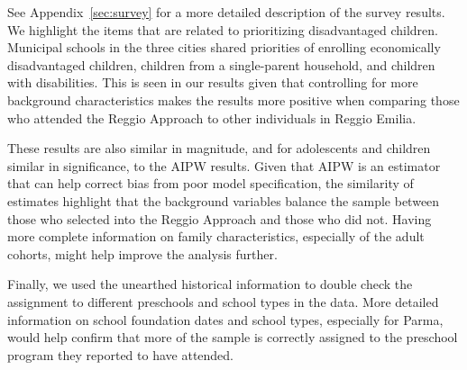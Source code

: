 See Appendix~\ref{sec:survey} for a more detailed description of the survey results. We highlight the items that are related to prioritizing disadvantaged children. Municipal schools in the three cities shared priorities of enrolling economically disadvantaged children, children from a single-parent household, and children with disabilities. This is seen in our results given that controlling for more background characteristics makes the results more positive when comparing those who attended the Reggio Approach to other individuals in Reggio Emilia. 

These results are also similar in magnitude, and for adolescents and children similar in significance, to the AIPW results. Given that AIPW is an estimator that can help correct bias from poor model specification, the similarity of estimates highlight that the background variables balance the sample between those who selected into the Reggio Approach and those who did not. Having more complete information on family characteristics, especially of the adult cohorts, might help improve the analysis further. 

Finally, we used the unearthed historical information to double check the assignment to different preschools and school types in the data. More detailed information on school foundation dates and school types, especially for Parma, would help confirm that more of the sample is correctly assigned to the preschool program they reported to have attended.

